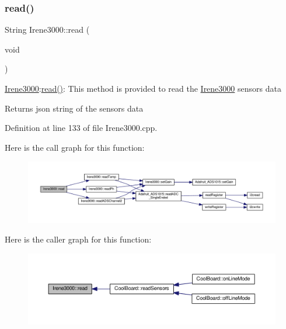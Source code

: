 \subsubsection{\texorpdfstring{read()}{read()}}
{\footnotesize\ttfamily String Irene3000\+::read (\begin{DoxyParamCaption}\item[{void}]{ }\end{DoxyParamCaption})}

\hyperlink{class_irene3000}{Irene3000}\+:\hyperlink{class_irene3000_a852a170feea994ea1df01c6b245b5d9a}{read()}\+: This method is provided to read the \hyperlink{class_irene3000}{Irene3000} sensors data

\begin{DoxyReturn}{Returns}
json string of the sensors data 
\end{DoxyReturn}


Definition at line 133 of file Irene3000.\+cpp.

Here is the call graph for this function\+:\nopagebreak
\begin{figure}[H]
\begin{center}
\leavevmode
\includegraphics[width=350pt]{class_irene3000_a852a170feea994ea1df01c6b245b5d9a_cgraph}
\end{center}
\end{figure}
Here is the caller graph for this function\+:\nopagebreak
\begin{figure}[H]
\begin{center}
\leavevmode
\includegraphics[width=350pt]{class_irene3000_a852a170feea994ea1df01c6b245b5d9a_icgraph}
\end{center}
\end{figure}
\mbox{\label{class_irene3000_ae73bd2ed14a199a7e83f4d6458476a7c}} 
